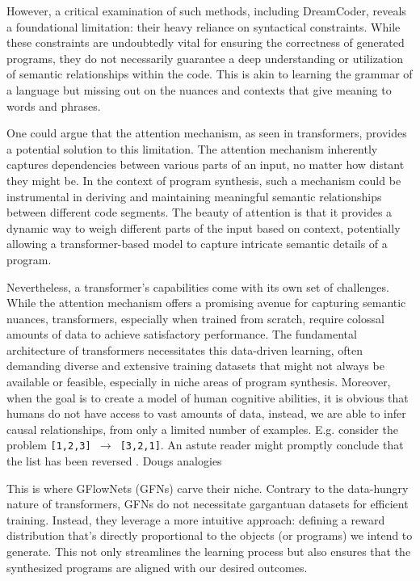 However, a critical examination of such methods, including DreamCoder, reveals a foundational limitation: their heavy reliance on syntactical constraints. While these constraints are undoubtedly vital for ensuring the correctness of generated programs, they do not necessarily guarantee a deep understanding or utilization of semantic relationships within the code. This is akin to learning the grammar of a language but missing out on the nuances and contexts that give meaning to words and phrases.

One could argue that the attention mechanism, as seen in transformers, provides a potential solution to this limitation. The attention mechanism inherently captures dependencies between various parts of an input, no matter how distant they might be. In the context of program synthesis, such a mechanism could be instrumental in deriving and maintaining meaningful semantic relationships between different code segments. The beauty of attention is that it provides a dynamic way to weigh different parts of the input based on context, potentially allowing a transformer-based model to capture intricate semantic details of a program.

Nevertheless, a transformer's capabilities come with its own set of challenges. While the attention mechanism offers a promising avenue for capturing semantic nuances, transformers, especially when trained from scratch, require colossal amounts of data to achieve satisfactory performance. The fundamental architecture of transformers necessitates this data-driven learning, often demanding diverse and extensive training datasets that might not always be available or feasible, especially in niche areas of program synthesis. Moreover, when the goal is to create a model of human cognitive abilities, it is obvious that humans do not have access to vast amounts of data, instead, we are able to infer causal relationships, from only a limited number of examples. E.g. consider the problem \texttt{[1,2,3] $\rightarrow$ [3,2,1]}. An astute reader might promptly conclude that the list has been reversed . 
Dougs analogies 

This is where GFlowNets (GFNs) carve their niche. Contrary to the data-hungry nature of transformers, GFNs do not necessitate gargantuan datasets for efficient training. Instead, they leverage a more intuitive approach: defining a reward distribution that's directly proportional to the objects (or programs) we intend to generate. This not only streamlines the learning process but also ensures that the synthesized programs are aligned with our desired outcomes.

